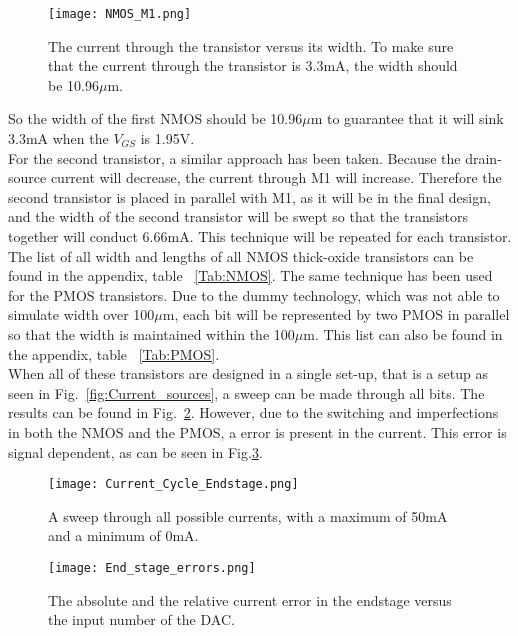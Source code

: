 \begin{figure}[h]
\begin{center}
\texttt{[image: NMOS\_M1.png]}
\caption{The current through the transistor versus its width. To make sure that the current through the transistor is 3.3mA, the width should be 10.96$\mu$m.}
\label{fig:NMOS_Width_Sweep_Result}
\end{center}
\end{figure}
So the width of the first NMOS should be 10.96$\mu$m to guarantee that it will sink 3.3mA when the $V_{GS}$ is 1.95V.\\
For the second transistor, a similar approach has been taken. Because the drain-source current will decrease, the current through M1 will increase. Therefore the second transistor is placed in parallel with M1, as it will be in the final design, and the width of the second transistor will be swept so that the transistors together will conduct 6.66mA. This technique will be repeated for each transistor. The list of all width and lengths of all NMOS thick-oxide transistors can be found in the appendix, table ~\ref{Tab:NMOS}.
The same technique has been used for the PMOS transistors. Due to the dummy technology, which was not able to simulate width over 100$\mu$m, each bit will be represented by two PMOS in parallel so that the width is maintained within the 100$\mu$m. This list can also be found in the appendix, table ~\ref{Tab:PMOS}.\\

When all of these transistors are designed in a single set-up, that is a setup as seen in Fig.~\ref{fig:Current_sources}, a sweep can be made through all bits. The results can be found in Fig.~\ref{fig:Final_result}. However, due to the switching and imperfections in both the NMOS and the PMOS, a error is present in the current. This error is signal dependent, as can be seen in Fig.\ref{fig:Current_error}.
\begin{figure}[h]
\begin{center}
\texttt{[image: Current\_Cycle\_Endstage.png]}
\caption{A sweep through all possible currents, with a maximum of 50mA and a minimum of 0mA.}
\label{fig:Final_result}
\end{center}
\end{figure}
\begin{figure}[h]
\begin{center}
\texttt{[image: End\_stage\_errors.png]}
\caption{The absolute and the relative current error in the endstage versus the input number of the DAC.}
\label{fig:Current_error}
\end{center}
\end{figure}
